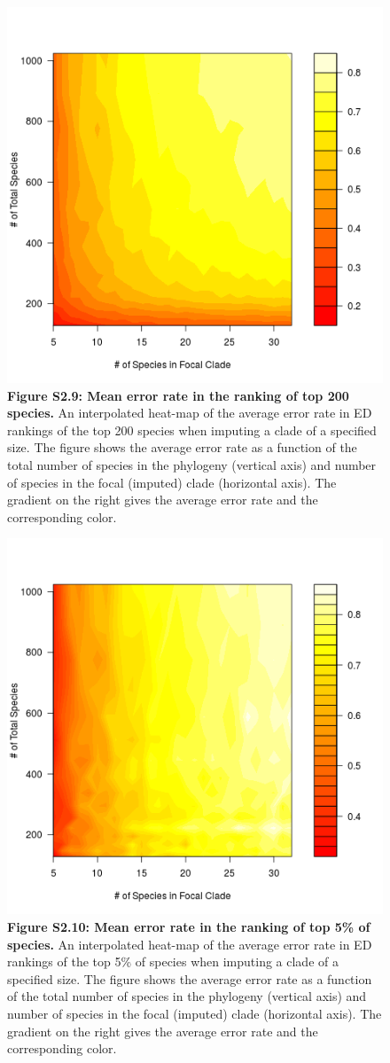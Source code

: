 \documentclass[10pt,english]{article}
\begin{document}
\begin{figure}[!ht]
  \center
  \includegraphics[width=.5\textwidth]{../figures/errorRate200.png}
  \caption*{\textbf{Figure S2.9: Mean error rate in the ranking of top 200
  species.} An interpolated heat-map of the average error rate in ED rankings of
  the top 200 species when imputing a clade of a specified size. The figure
  shows the average error rate as a function of the total number of species in
  the phylogeny (vertical axis) and number of species in the focal (imputed)
  clade (horizontal axis). The gradient on the right gives the average error
  rate and the corresponding color.}
\end{figure}

\begin{figure}[!ht]
  \center
  \includegraphics[width=.5\textwidth]{../figures/errorRate5pct.png}
  \caption*{\textbf{Figure S2.10: Mean error rate in the ranking of top 5\% of
  species.} An interpolated heat-map of the average error rate in ED rankings of
  the top 5\% of species when imputing a clade of a specified size. The figure
  shows the average error rate as a function of the total number of species in
  the phylogeny (vertical axis) and number of species in the focal (imputed)
  clade (horizontal axis). The gradient on the right gives the average error
  rate and the corresponding color.}
\end{figure}
\end{document}
